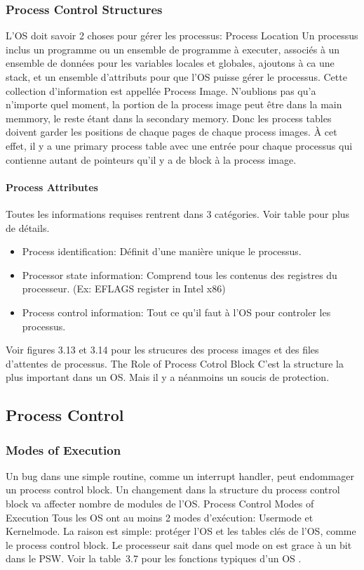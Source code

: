 \subsubsection{Process Control Structures}
L'OS doit savoir 2 choses pour gérer les processus:
Process Location
Un processus inclus un programme ou un ensemble de programme à executer, associés à un ensemble de données pour les variables locales et globales, ajoutons à ca une stack, et un ensemble d'attributs pour que l'OS puisse gérer le processus.
Cette collection d'information est appellée Process Image.
N'oublions pas qu'a n'importe quel moment, la portion de la process image peut être dans la main memmory, le reste étant dans la secondary memory.
Donc les process tables doivent garder les positions de chaque pages de chaque process images.
À cet effet, il y a une primary process table avec une entrée pour chaque processus qui contienne autant de pointeurs qu'il y a de block à la process image.

\paragraph{Process Attributes}
Toutes les informations requises rentrent dans 3 catégories.
Voir table \cite[p.~150]{stallings} pour plus de détails.
\begin{itemize}
  \item Process identification: Définit d'une manière unique le processus.
  \item Processor state information: Comprend tous les contenus des registres du processeur.
    (Ex: EFLAGS register in Intel x86)
  \item Process control information: Tout ce qu'il faut à l'OS pour controler les processus.
\end{itemize}
Voir figures 3.13 et 3.14 \cite[p.~153-154]{stallings} pour les strucures des process images et des files d'attentes de processus.
The Role of Process Cotrol Block
C'est la structure la plus important dans un OS.
Mais il y a néanmoins un soucis de protection.

\subsection{Process Control}
\subsubsection{Modes of Execution}
Un bug dans une simple routine, comme un interrupt handler, peut endommager un process control block.
Un changement dans la structure du process control block va affecter nombre de modules de l'OS.
Process Control Modes of Execution
Tous les OS ont au moins 2 modes d'exécution: Usermode et Kernelmode.
La raison est simple: protéger l'OS et les tables clés de l'OS, comme le process control block.
Le processeur sait dans quel mode on est grace à un bit dans le PSW.
Voir la table~3.7 pour les fonctions typiques d'un OS \cite[p.~135]{stallings}.

